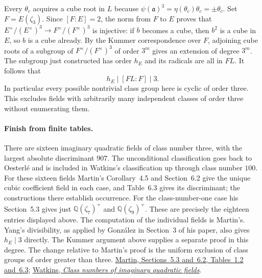 Every $\theta_c$ acquires a cube root in $L$ because
$\psi(\mathfrak a)^3=\eta(\theta_c)\theta_c=\pm\theta_c$.
Set $F=E(\zeta_3)$. Since $[F:E]=2$, the norm from $F$ to $E$ proves
that $E^\times/(E^\times)^3\longrightarrow F^\times/(F^\times)^3$
is injective: if $b$ becomes a cube, then $b^2$ is a cube in $E$,
so $b$ is a cube already. By the Kummer correspondence over $F$,
adjoining cube roots of a subgroup of $F^\times/(F^\times)^3$
of order $3^m$ gives an extension of degree $3^m$.
The subgroup just constructed has order $h_E$ and its radicals are
all in $FL$. It follows that
\[
               h_E\mid[FL:F]\mid3 .
\]
In particular every possible nontrivial class group here is cyclic of order
three. This excludes fields with arbitrarily many independent classes
of order three without enumerating them.

\paragraph{Finish from finite tables.}
There are sixteen imaginary quadratic fields of class number three,
with the largest absolute discriminant $907$. The unconditional
classification goes back to Oesterl\'e and is included in Watkins's
classification up through class number $100$.
For these sixteen fields Martin's Corollary~4.5 and Section~6.2
give the unique cubic coefficient field in each case, and
Table~6.3 gives its discriminant; the constructions there establish
occurrence. For the class-number-one case his Section~5.3 gives just
$\mathbb Q(\zeta_7)^+$ and $\mathbb Q(\zeta_9)^+$. These are precisely
the eighteen entries displayed above. The computation of the individual
fields is Martin's. Yang's divisibility, as applied by Gonz\'alez in Section~3 of his paper,
also gives $h_E\mid3$ directly. The Kummer argument above supplies
a separate proof in this degree. The change relative to Martin's proof is the uniform exclusion
of class groups of order greater than three.
\href{https://arxiv.org/pdf/2509.24119v2}{Martin, Sections~5.3 and~6.2, Tables~1.2 and~6.3};
\href{https://magma.maths.usyd.edu.au/~watkins/papers/smallcn.pdf}{Watkins, \emph{Class numbers of imaginary quadratic fields}}.
